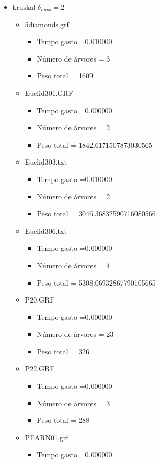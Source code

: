 \begin{itemize}
\item kruskal $\delta_{max}=2$
\begin{itemize}
\item 5diamonds.grf
\begin{itemize}
\item Tempo gasto =0.010000
\item Número de árvores = 3
\item Peso total = 1609
\end{itemize}
\item Euclid301.GRF
\begin{itemize}
\item Tempo gasto =0.000000
\item Número de árvores = 2
\item Peso total = 1842.6171507873030565
\end{itemize}
\item Euclid303.txt
\begin{itemize}
\item Tempo gasto =0.010000
\item Número de árvores = 2
\item Peso total = 3046.36832590716080566
\end{itemize}
\item Euclid306.txt
\begin{itemize}
\item Tempo gasto =0.000000
\item Número de árvores = 4
\item Peso total = 5308.06932867790105665
\end{itemize}
\item P20.GRF
\begin{itemize}
\item Tempo gasto =0.000000
\item Número de árvores = 23
\item Peso total = 326
\end{itemize}
\item P22.GRF
\begin{itemize}
\item Tempo gasto =0.000000
\item Número de árvores = 3
\item Peso total = 288
\end{itemize}
\item PEARN01.grf
\begin{itemize}
\item Tempo gasto =0.000000

\end{itemize}
\end{itemize}
\end{itemize}
